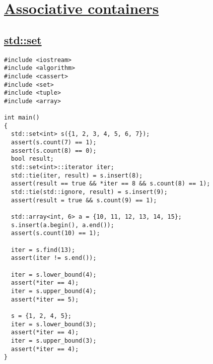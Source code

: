 \documentclass{book}
\begin{document}
	\section{\href{https://en.wikipedia.org/wiki/Associative_array}{Associative containers}}
	\subsection{\href{https://en.cppreference.com/w/cpp/container/set}{std::set}}
	\begin{lstlisting}
#include <iostream>
#include <algorithm>
#include <cassert>
#include <set>
#include <tuple>
#include <array>

int main()
{
  std::set<int> s({1, 2, 3, 4, 5, 6, 7});
  assert(s.count(7) == 1);
  assert(s.count(8) == 0);
  bool result;
  std::set<int>::iterator iter;
  std::tie(iter, result) = s.insert(8);
  assert(result == true && *iter == 8 && s.count(8) == 1);
  std::tie(std::ignore, result) = s.insert(9);
  assert(result = true && s.count(9) == 1);

  std::array<int, 6> a = {10, 11, 12, 13, 14, 15};
  s.insert(a.begin(), a.end());
  assert(s.count(10) == 1);

  iter = s.find(13);
  assert(iter != s.end());

  iter = s.lower_bound(4);
  assert(*iter == 4);
  iter = s.upper_bound(4);
  assert(*iter == 5);

  s = {1, 2, 4, 5};
  iter = s.lower_bound(3);
  assert(*iter == 4);
  iter = s.upper_bound(3);
  assert(*iter == 4);
}
	\end{lstlisting}
\end{document}
